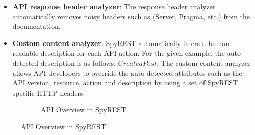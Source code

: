 \begin{itemize}[leftmargin=*]
  \item \textbf{API response header analyzer}: The response header analyzer automatically removes noisy headers such as (Server, Pragma, etc.) from the documentation.

  \item \textbf{Custom content analyzer}: SpyREST automatically infers a human readable description for each API action. For the given example, the auto detected description is as follows: $Create a Post$. The custom content analyzer allows API developers to override the auto-detected attributes such as the API version, resource, action and description by using a set of SpyREST specific HTTP headers.
\end{itemize}

\begin{figure}
  \begin{subfigure}[b]{\textwidth}
    \caption{API Overview in SpyREST}
    \label{fig:screenshot_overview}
  \end{subfigure}


\end{figure}
